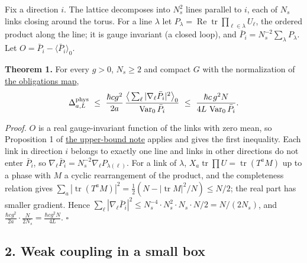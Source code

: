 \documentclass[11pt,a4paper]{article}
\begin{document}
Fix a direction \(i\). The lattice decomposes into \(N_s^2\) lines
parallel to \(i\), each of \(N_s\) links closing around the torus. For a
line \(\lambda\) let
\(P_\lambda=\operatorname{Re}\operatorname{tr}\prod_{\ell\in\lambda}U_\ell\),
the ordered product along the line; it is gauge invariant (a closed
loop), and \(\bar P_i=N_s^{-2}\sum_\lambda P_\lambda\). Let
\(O=\bar P_i-\langle\bar P_i\rangle_0\).

\textbf{Theorem 1.} For every \(g>0\), \(N_s\ge2\) and compact \(G\)
with the normalization of \href{mass-gap-obligations-lattice.md}{the
obligations map},
\[\Delta^{\rm phys}_{a,L}\ \le\ \frac{\hbar cg^2}{2a}\,
\frac{\big\langle\sum_\ell|\nabla_\ell\bar P_i|^2\big\rangle_0}{\operatorname{Var}_0\bar P_i}
\ \le\ \frac{\hbar c\,g^2N}{4L\,\operatorname{Var}_0\bar P_i}.\]

\emph{Proof.} \(O\) is a real gauge-invariant function of the links with
zero mean, so Proposition 1 of \href{lattice-gap-upper-bounds.md}{the
upper-bound note} applies and gives the first inequality. Each link in
direction \(i\) belongs to exactly one line and links in other
directions do not enter \(\bar P_i\), so
\(\nabla_\ell\bar P_i=N_s^{-2}\nabla_\ell P_{\lambda(\ell)}\). For a
link of \(\lambda\),
\(X_a\operatorname{tr}\prod U=\operatorname{tr}(T^aM)\) up to a phase
with \(M\) a cyclic rearrangement of the product, and the completeness
relation gives
\(\sum_a|\operatorname{tr}(T^aM)|^2=\tfrac12(N-|\operatorname{tr}M|^2/N)\le N/2\);
the real part has smaller gradient. Hence
\(\sum_\ell|\nabla_\ell\bar P_i|^2\le N_s^{-4}\cdot N_s^2\cdot N_s\cdot N/2=N/(2N_s)\),
and \(\frac{\hbar cg^2}{2a}\cdot\frac{N}{2N_s}=\frac{\hbar cg^2N}{4L}\).
\(\square\)

\hypertarget{weak-coupling-in-a-small-box}{%
\subsection{2. Weak coupling in a small
box}\label{weak-coupling-in-a-small-box}}
\end{document}
